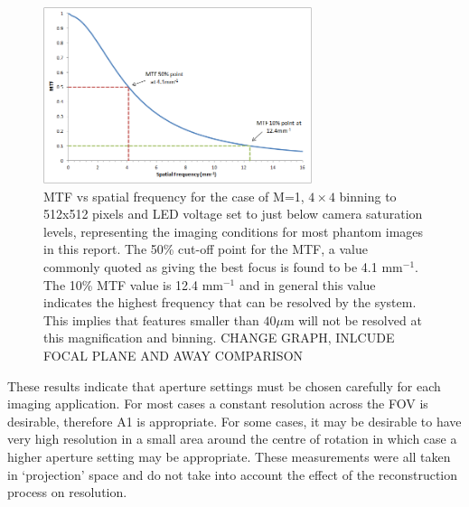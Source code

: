 	\begin{figure}[H]
		\centering
		\includegraphics[width = 0.7\textwidth]{meth_img/MTF_50_graph.png}
		\caption{MTF vs spatial frequency for the case of M=1, $4 \times 4$ binning to 512x512 pixels and  LED voltage set to just below camera saturation levels, representing the imaging conditions  for most phantom images in this report. The 50\% cut-off point for the MTF, a value commonly quoted as giving the best focus is found to be 4.1 mm$^{-1}$. The 10\% MTF value is 12.4 mm$^{-1}$ and in general this value indicates the highest  frequency that can be resolved by the system. This implies that features smaller than $40 \mu$m will not be resolved at this magnification and binning. CHANGE GRAPH, INLCUDE FOCAL PLANE AND AWAY COMPARISON}
		\label{fig:MTF_50}
	\end{figure}




These results indicate that aperture settings must be chosen carefully for each imaging application. For most cases a constant resolution across the FOV is desirable, therefore A1 is appropriate. For some cases, it may be desirable to have very high resolution in a small area around the centre of rotation in which case a higher aperture setting may be appropriate. 
These measurements were all taken in `projection' space and do not take into account the effect of the reconstruction process on resolution. 




